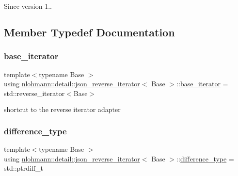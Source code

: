 \begin{DoxySince}{Since}
version 1.. 
\end{DoxySince}


\subsection{Member Typedef Documentation}
\mbox{\label{classnlohmann_1_1detail_1_1json__reverse__iterator_a6b2ef1d632fe49bfcc22fbd1abd62395}} 
\subsubsection{\texorpdfstring{base\+\_\+iterator}{base\_iterator}}
{\footnotesize\ttfamily template$<$typename Base $>$ \\
using \hyperlink{classnlohmann_1_1detail_1_1json__reverse__iterator}{nlohmann\+::detail\+::json\+\_\+reverse\+\_\+iterator}$<$ Base $>$\+::\hyperlink{classnlohmann_1_1detail_1_1json__reverse__iterator_a6b2ef1d632fe49bfcc22fbd1abd62395}{base\+\_\+iterator} =  std\+::reverse\+\_\+iterator$<$Base$>$}



shortcut to the reverse iterator adapter 

\mbox{\label{classnlohmann_1_1detail_1_1json__reverse__iterator_a9ab55987c05ec6427ad36082e351cc45}} 
\subsubsection{\texorpdfstring{difference\+\_\+type}{difference\_type}}
{\footnotesize\ttfamily template$<$typename Base $>$ \\
using \hyperlink{classnlohmann_1_1detail_1_1json__reverse__iterator}{nlohmann\+::detail\+::json\+\_\+reverse\+\_\+iterator}$<$ Base $>$\+::\hyperlink{classnlohmann_1_1detail_1_1json__reverse__iterator_a9ab55987c05ec6427ad36082e351cc45}{difference\+\_\+type} =  std\+::ptrdiff\+\_\+t}

